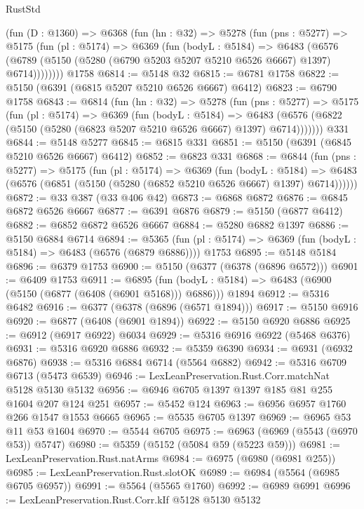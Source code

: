 \begin{lexlean}{RustStd}
\begin{coremodule}
    (fun (D : @1360) =>
    @6368
      (fun (hn : @32) =>
      @5278
        (fun (pns : @5277) =>
        @5175
          (fun (pl : @5174) =>
          @6369
            (fun (bodyL : @5184) =>
            @6483
              (@6576 (@6789 (@5150 (@5280 (@6790 @5203 @5207 @5210 @6526 @6667) @1397) @6714))))))))
    @1758
@6814 := @5148 @32
@6815 := @6781 @1758
@6822 := @5150 (@6391 (@6815 @5207 @5210 @6526 @6667) @6412)
@6823 := @6790 @1758
@6843 := @6814
    (fun (hn : @32) =>
    @5278
      (fun (pns : @5277) =>
      @5175
        (fun (pl : @5174) =>
        @6369
          (fun (bodyL : @5184) =>
          @6483 (@6576 (@6822 (@5150 (@5280 (@6823 @5207 @5210 @6526 @6667) @1397) @6714)))))))
    @331
@6844 := @5148 @5277
@6845 := @6815 @331
@6851 := @5150 (@6391 (@6845 @5210 @6526 @6667) @6412)
@6852 := @6823 @331
@6868 := @6844
    (fun (pns : @5277) =>
    @5175
      (fun (pl : @5174) =>
      @6369
        (fun (bodyL : @5184) =>
        @6483 (@6576 (@6851 (@5150 (@5280 (@6852 @5210 @6526 @6667) @1397) @6714))))))
@6872 := @33 @387 (@33 @406 @42)
@6873 := @6868 @6872
@6876 := @6845 @6872 @6526 @6667
@6877 := @6391 @6876
@6879 := @5150 (@6877 @6412)
@6882 := @6852 @6872 @6526 @6667
@6884 := @5280 @6882 @1397
@6886 := @5150 @6884 @6714
@6894 := @5365
    (fun (pl : @5174) => @6369 (fun (bodyL : @5184) => @6483 (@6576 (@6879 @6886))))
    @1753
@6895 := @5148 @5184
@6896 := @6379 @1753
@6900 := @5150 (@6377 (@6378 (@6896 @6572)))
@6901 := @6409 @1753
@6911 := @6895
    (fun (bodyL : @5184) => @6483 (@6900 (@5150 (@6877 (@6408 (@6901 @5168))) @6886)))
    @1894
@6912 := @5316 @6482
@6916 := @6377 (@6378 (@6896 (@6571 @1894)))
@6917 := @5150 @6916
@6920 := @6877 (@6408 (@6901 @1894))
@6922 := @5150 @6920 @6886
@6925 := @6912 (@6917 @6922) @6034
@6929 := @5316 @6916 @6922 (@5468 @6376)
@6931 := @5316 @6920 @6886
@6932 := @5359 @6390
@6934 := @6931 (@6932 @6876)
@6938 := @5316 @6884 @6714 (@5564 @6882)
@6942 := @5316 @6709 @6713 (@5473 @6539)
@6946 := LexLeanPreservation.Rust.Corr.matchNat @5128 @5130 @5132
@6956 := @6946 @6705 @1397 @1397 @185 @81 @255 @1604 @207 @124 @251
@6957 := @5452 @124
@6963 := @6956 @6957 @1760 @266 @1547 @1553 @6665
@6965 := @5535 @6705 @1397
@6969 := @6965 @53 @11 @53 @1604
@6970 := @5544 @6705
@6975 := @6963 (@6969 (@5543 (@6970 @53)) @5747)
@6980 := @5359 (@5152 (@5084 @59 (@5223 @59)))
@6981 := LexLeanPreservation.Rust.natArms
@6984 := @6975 (@6980 (@6981 @255))
@6985 := LexLeanPreservation.Rust.slotOK
@6989 := @6984 (@5564 (@6985 @6705 @6957))
@6991 := @5564 (@5565 @1760)
@6992 := @6989 @6991
@6996 := LexLeanPreservation.Rust.Corr.kIf @5128 @5130 @5132

\end{coremodule}
\end{lexlean}
